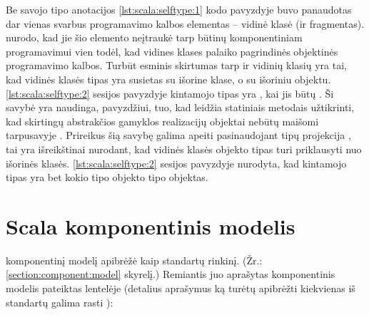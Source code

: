 \begin{scalacodelisting}
  \label{lst:scala:selftype:1}
\end{scalacodelisting}

\begin{scalainterpreterlisting}
  \label{lst:scala:selftype:2}
\end{scalainterpreterlisting}

Be savojo tipo anotacijos \ref{lst:scala:selftype:1} kodo pavyzdyje buvo
panaudotas dar vienas svarbus programavimo kalbos elementas – vidinė
klasė (ir fragmentas). \cite[12]{scalable-component-abstractions}
nurodo, kad jie šio elemento neįtraukė tarp būtinų komponentiniam
programavimui vien todėl, kad vidines klases palaiko pagrindinės
 objektinės programavimo kalbos. Turbūt esminis
skirtumas tarp  ir  vidinių klasių
yra tai, kad  vidinės klasės tipas yra susietas su
išorine klase, o  su išoriniu objektu.
\ref{lst:scala:selftype:2}  sesijos pavyzdyje kintamojo
 tipas yra , kai  jis
būtų . Ši savybė yra naudinga, pavyzdžiui, tuo, kad 
leidžia statiniais metodais užtikrinti, kad skirtingų abstrakčios
gamyklos  realizacijų objektai nebūtų maišomi
tarpusavyje \cite[36]{scala-design-patterns}. Prireikus šią savybę
galima apeiti pasinaudojant tipų projekcija ,
tai yra išreikštinai nurodant, kad vidinės klasės objekto tipas
turi priklausyti nuo išorinės klasės. \ref{lst:scala:selftype:2}
sesijos pavyzdyje nurodyta, kad kintamojo  tipas yra
bet kokio  tipo objekto  tipo objektas.

\section{Scala komponentinis modelis}

\cite[37]{heineman2001component} komponentinį modelį apibrėžė kaip
standartų rinkinį. (Žr.: \ref{section:component:model} skyrelį.)
Remiantis juo aprašytas  komponentinis modelis
pateiktas lentelėje (detalius aprašymus ką turėtų apibrėžti
kiekvienas iš standartų galima rasti
\cite[38-44]{heineman2001component}):

